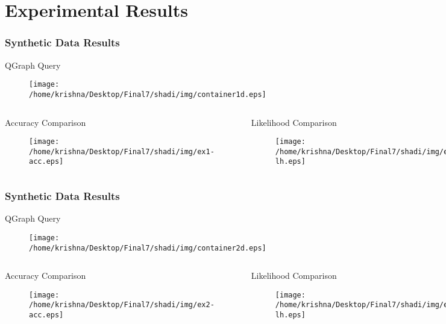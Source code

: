 \documentclass[10pt, blue,subsection=true, compress]{beamer}
\begin{document}
\section{Experimental Results}
\begin{frame}\frametitle{Synthetic Data Results}
\begin{block}{QGraph Query}
\begin{figure}[htbp]
\centering
\texttt{[image: /home/krishna/Desktop/Final7/shadi/img/container1d.eps]}
\end{figure}
\end{block}
\begin{columns}[t]
\begin{block}{Accuracy Comparison}
\begin{figure}[htbp]
\centering
\texttt{[image: /home/krishna/Desktop/Final7/shadi/img/ex1-acc.eps]}
\end{figure}
\end{block}
\begin{block}{Likelihood Comparison}
\begin{figure}[htbp]
\centering
\texttt{[image: /home/krishna/Desktop/Final7/shadi/img/ex1-lh.eps]}
\label{fig:4.2}
\end{figure}
\end{block}
\end{columns}
\end{frame}
\begin{frame}\frametitle{Synthetic Data Results}
\begin{block}{QGraph Query}
\begin{figure}[htbp]
\centering
\texttt{[image: /home/krishna/Desktop/Final7/shadi/img/container2d.eps]}
\end{figure}
\end{block}
\begin{columns}[t]
\begin{block}{Accuracy Comparison}
\begin{figure}[htbp]
\centering
\texttt{[image: /home/krishna/Desktop/Final7/shadi/img/ex2-acc.eps]}
\end{figure}
\end{block}
\begin{block}{Likelihood Comparison}
\begin{figure}[htbp]
\centering
\texttt{[image: /home/krishna/Desktop/Final7/shadi/img/ex2-lh.eps]}
\label{fig:4.2}
\end{figure}
\end{block}
\end{columns}
\end{frame}
\end{document}
